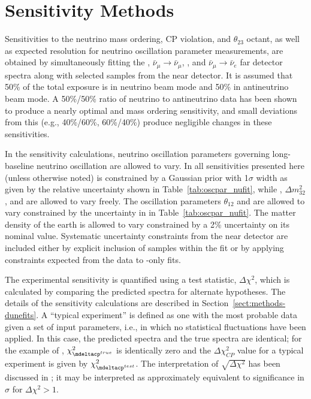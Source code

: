 \section{Sensitivity Methods}
\label{sec:physics-lbnosc-sens}



Sensitivities to the neutrino mass ordering, CP violation, and $\theta_{23}$ octant, as well as expected resolution for neutrino oscillation parameter measurements, are obtained by simultaneously fitting the \numutonumu, $\bar{\nu}_\mu \rightarrow \bar{\nu}_\mu$, \numutonue, and $\bar{\nu}_\mu \rightarrow \bar{\nu}_e$ far detector spectra along with selected samples from the near detector.  It is assumed that 50\% of the total exposure is in neutrino beam mode and 50\% in antineutrino beam mode.  A 50\%/50\% ratio of neutrino to antineutrino data has been shown to produce a nearly optimal \deltacp and mass ordering sensitivity, and small deviations from this (e.g., 40\%/60\%, 60\%/40\%) produce negligible changes in these sensitivities. %

In the sensitivity calculations, neutrino oscillation parameters governing long-baseline neutrino oscillation are allowed to vary. In all sensitivities presented here (unless otherwise noted)  is constrained by a Gaussian prior with 1$\sigma$ width as given by the relative uncertainty shown in Table~\ref{tab:oscpar_nufit}, while , $\Delta m^{2}_{32}$, and \deltacp are allowed to vary freely. The oscillation parameters $\theta_{12}$ and  are allowed to vary constrained by the uncertainty in in Table~\ref{tab:oscpar_nufit}. The matter density of the earth is allowed to vary constrained by a 2\% uncertainty on its nominal value. Systematic uncertainty constraints from the near detector are included either by explicit inclusion of  samples within the fit or by applying constraints expected from the  data to -only fits.

The experimental sensitivity is quantified using a test statistic, $\Delta\chi^2$, which is calculated by comparing the predicted spectra for alternate hypotheses.  The details of the sensitivity calculations are described in Section~\ref{sect:methods-dunefits}. 
A ``typical experiment'' is defined as one with the most probable data given a set of input parameters, i.e., in which no statistical fluctuations have been applied. In this case, the predicted spectra and the true spectra are identical; for the example of , $\chi^2_{\mdeltacp^{true}}$ is identically zero and the $\Delta\chi^2_{CP}$ value for a typical experiment is given by $\chi^2_{\mdeltacp^{test}}$. The interpretation of $\sqrt{\Delta\chi^2}$ has been discussed in \cite{Qian:2012zn,Blennow:2013oma}; it may be interpreted as approximately equivalent to significance in $\sigma$ for $\Delta\chi^2>1$. 



